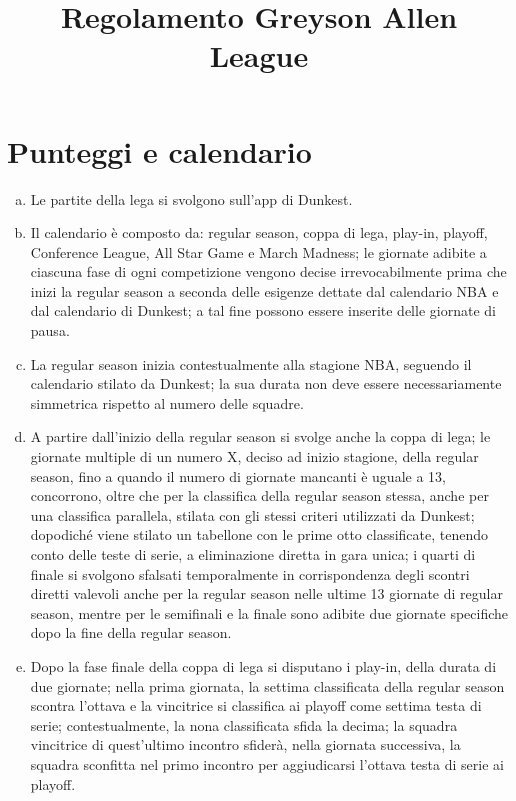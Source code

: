 \documentclass{article}
\title{Regolamento Greyson Allen League}
\author{}
\date{}
\begin{document}
\maketitle
\tableofcontents
\thispagestyle{empty}
\newpage
\setcounter{page}{1}

\section{Punteggi e calendario}\label{Punteggi e calendario}
\begin{enumerate}[(a)]
\item Le partite della lega si svolgono sull'app di Dunkest.
\item Il calendario è composto da: regular season, coppa di lega, play-in, playoff, Conference League, All Star Game e March Madness; le giornate adibite a ciascuna fase di ogni competizione vengono decise irrevocabilmente prima che inizi la regular season a seconda delle esigenze dettate dal calendario NBA e dal calendario di Dunkest; a tal fine possono essere inserite delle giornate di pausa.
\item La regular season inizia contestualmente alla stagione NBA, seguendo il calendario stilato da Dunkest; la sua durata non deve essere necessariamente simmetrica rispetto al numero delle squadre. 
\item A partire dall'inizio della regular season si svolge anche la coppa di lega; le giornate multiple di un numero X, deciso ad inizio stagione, della regular season, fino a quando il numero di giornate mancanti è uguale a 13, concorrono, oltre che per la classifica della regular season stessa, anche per una classifica parallela, stilata con gli stessi criteri utilizzati da Dunkest; dopodiché viene stilato un tabellone con le prime otto classificate, tenendo conto delle teste di serie, a eliminazione diretta in gara unica; i quarti di finale si svolgono sfalsati temporalmente in corrispondenza degli scontri diretti valevoli anche per la regular season nelle ultime 13 giornate di regular season, mentre per le semifinali e la finale sono adibite due giornate specifiche dopo la fine della regular season.
\item Dopo la fase finale della coppa di lega si disputano i play-in, della durata di due giornate; nella prima giornata, la settima classificata della regular season scontra l'ottava e la vincitrice si classifica ai playoff come settima testa di serie; contestualmente, la nona classificata sfida la decima; la squadra vincitrice di quest'ultimo incontro sfiderà, nella giornata successiva, la squadra sconfitta nel primo incontro per aggiudicarsi l'ottava testa di serie ai playoff.

\end{enumerate}
\end{document}
